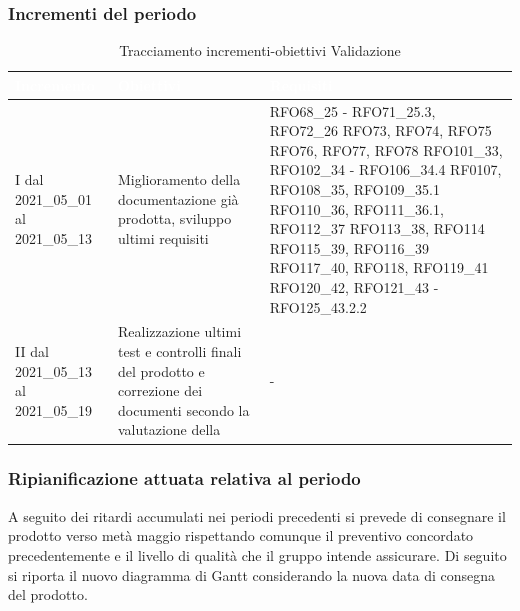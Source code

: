 \subsubsection{Incrementi del periodo}
\label{IncrementiValidazione}
\begin{table}[H]
	\begin{center}
		\begin{tabular}{ |C{3cm} C{6cm} C{7cm}| }
			\textcolor{white}{\textbf{Incremento}} & \textcolor{white}{\textbf{Obiettivi}} & \textcolor{white}{\textbf{Requisiti}} \\ \hline
			I dal 2021\_05\_01 al 2021\_05\_13& Miglioramento della documentazione già prodotta, sviluppo ultimi requisiti & RFO68\_25 - RFO71\_25.3, RFO72\_26 \newline
			RFO73,
			RFO74,
			RFO75 \newline
			RFO76, RFO77, RFO78 \newline
			RFO101\_33, RFO102\_34 - RFO106\_34.4 \newline
			RF0107,  RFO108\_35, RFO109\_35.1 \newline 
			RFO110\_36, RFO111\_36.1, RFO112\_37 \newline
			RFO113\_38, RFO114 \newline RFO115\_39, RFO116\_39 \newline
			RFO117\_40,
			RFO118, RFO119\_41 \newline
			RFO120\_42, RFO121\_43 - RFO125\_43.2.2
			\\ \hline
			II dal 2021\_05\_13 al 2021\_05\_19 	& 
			Realizzazione ultimi test e controlli finali del prodotto e correzione dei documenti secondo la valutazione della  & -\\ \hline
		\end{tabular}
		\caption{Tracciamento incrementi-obiettivi Validazione}
	\end{center}
\end{table}
\subsubsection{Ripianificazione attuata relativa al periodo} \label{RipianificazioneValidazione}
A seguito dei ritardi accumulati nei periodi precedenti si prevede di consegnare il prodotto verso metà maggio rispettando comunque il preventivo concordato precedentemente e il livello di qualità che il gruppo intende assicurare. Di seguito si riporta il nuovo diagramma di Gantt considerando la nuova data di consegna del prodotto.
